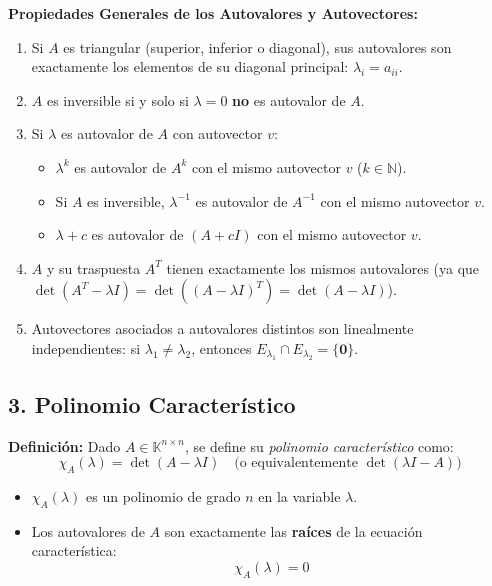 \documentclass[11pt,a4paper]{article}
\begin{document}
\vspace{0.5em}
\noindent
\textbf{Propiedades Generales de los Autovalores y Autovectores:}
\begin{enumerate}
    \item Si $A$ es triangular (superior, inferior o diagonal), sus autovalores son exactamente los elementos de su diagonal principal: $\lambda_i = a_{ii}$.
    \item $A$ es inversible si y solo si $\lambda = 0$ \textbf{no} es autovalor de $A$.
    \item Si $\lambda$ es autovalor de $A$ con autovector $v$:
    \begin{itemize}
        \item $\lambda^k$ es autovalor de $A^k$ con el mismo autovector $v$ ($k \in \mathbb{N}$).
        \item Si $A$ es inversible, $\lambda^{-1}$ es autovalor de $A^{-1}$ con el mismo autovector $v$.
        \item $\lambda + c$ es autovalor de $(A + cI)$ con el mismo autovector $v$.
    \end{itemize}
    \item $A$ y su traspuesta $A^T$ tienen exactamente los mismos autovalores (ya que $\det(A^T - \lambda I) = \det((A - \lambda I)^T) = \det(A - \lambda I)$).
    \item Autovectores asociados a autovalores distintos son linealmente independientes: si $\lambda_1 \neq \lambda_2$, entonces $E_{\lambda_1} \cap E_{\lambda_2} = \{\mathbf{0}\}$.
\end{enumerate}

\subsection*{3. Polinomio Característico}

\textbf{Definición:} Dado $A \in \mathbb{K}^{n \times n}$, se define su \emph{polinomio característico} como:
\[
\chi_A(\lambda) = \det(A - \lambda I) \quad \text{(o equivalentemente } \det(\lambda I - A)\text{)}
\]
\begin{itemize}
    \item $\chi_A(\lambda)$ es un polinomio de grado $n$ en la variable $\lambda$.
    \item Los autovalores de $A$ son exactamente las \textbf{raíces} de la ecuación característica:
    \[
    \chi_A(\lambda) = 0
    \]
\end{itemize}
\end{document}
